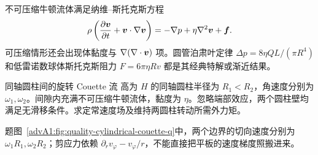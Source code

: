 {不可压缩牛顿流体满足纳维--斯托克斯方程
\[
 \rho\left(\frac{\partial\bm{v}}{\partial t}
 +\bm{v}\cdot\nabla\bm{v}\right)
 =-\nabla p+\eta\nabla^2\bm{v}+\bm{f}.
\]
可压缩情形还会出现体黏度与 $\nabla(\nabla\cdot\bm{v})$ 项。圆管泊肃叶定律
$\Delta p=8\eta QL/(\pi R^4)$ 和低雷诺数球体斯托克斯阻力
$F=6\pi\eta Rv$ 都是其经典特解或渐近结果。

\begin{advexamplebox}{同轴圆柱间的旋转 Couette 流}\label{advA1:ex:cylindrical-couette}
高为 $H$ 的同轴圆柱半径为 $R_1<R_2$，角速度分别为
$\omega_1,\omega_2$。间隙内充满不可压缩牛顿流体，黏度为 $\eta$。忽略端部效应，两个圆柱壁均满足无滑移条件。求定常速度场及维持两圆柱转动所需外力矩。

\begin{qualityfigure}
\label{advA1:fig:quality-cylindrical-couette-q}
\end{qualityfigure}
\end{advexamplebox}
\begin{advsolution}题图~\ref{advA1:fig:quality-cylindrical-couette-q}中，两个边界的切向速度分别为 $\omega_1R_1,\omega_2R_2$；剪应力依赖 $\partial_rv_\varphi-v_\varphi/r$，不能直接把平板的速度梯度照搬进来。


\end{advsolution}}

